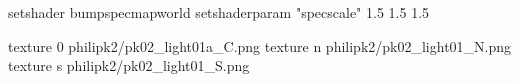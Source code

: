 setshader bumpspecmapworld
setshaderparam "specscale" 1.5 1.5 1.5

texture 0 philipk2/pk02_light01a_C.png
texture n philipk2/pk02_light01_N.png
texture s philipk2/pk02_light01_S.png

